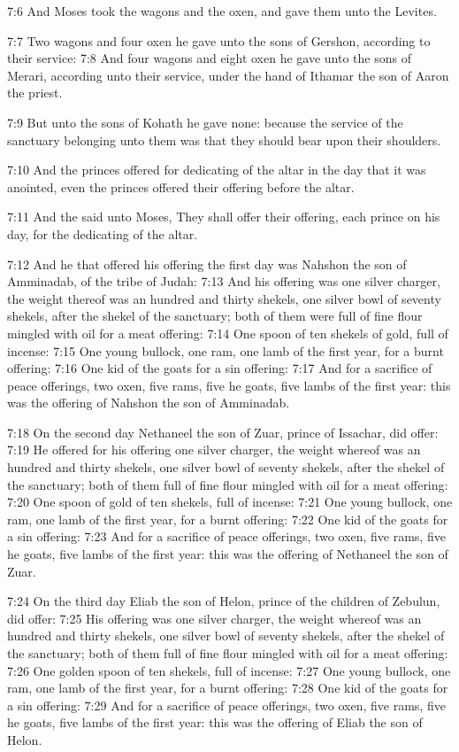 7:6 And Moses took the wagons and the oxen, and gave them unto the
Levites.

7:7 Two wagons and four oxen he gave unto the sons of Gershon,
according to their service: 7:8 And four wagons and eight oxen he gave
unto the sons of Merari, according unto their service, under the hand
of Ithamar the son of Aaron the priest.

7:9 But unto the sons of Kohath he gave none: because the service of
the sanctuary belonging unto them was that they should bear upon their
shoulders.

7:10 And the princes offered for dedicating of the altar in the day
that it was anointed, even the princes offered their offering before
the altar.

7:11 And the \LORD said unto Moses, They shall offer their offering,
each prince on his day, for the dedicating of the altar.

7:12 And he that offered his offering the first day was Nahshon the
son of Amminadab, of the tribe of Judah: 7:13 And his offering was one
silver charger, the weight thereof was an hundred and thirty shekels,
one silver bowl of seventy shekels, after the shekel of the sanctuary;
both of them were full of fine flour mingled with oil for a meat
offering: 7:14 One spoon of ten shekels of gold, full of incense: 7:15
One young bullock, one ram, one lamb of the first year, for a burnt
offering: 7:16 One kid of the goats for a sin offering: 7:17 And for a
sacrifice of peace offerings, two oxen, five rams, five he goats, five
lambs of the first year: this was the offering of Nahshon the son of
Amminadab.

7:18 On the second day Nethaneel the son of Zuar, prince of Issachar,
did offer: 7:19 He offered for his offering one silver charger, the
weight whereof was an hundred and thirty shekels, one silver bowl of
seventy shekels, after the shekel of the sanctuary; both of them full
of fine flour mingled with oil for a meat offering: 7:20 One spoon of
gold of ten shekels, full of incense: 7:21 One young bullock, one ram,
one lamb of the first year, for a burnt offering: 7:22 One kid of the
goats for a sin offering: 7:23 And for a sacrifice of peace offerings,
two oxen, five rams, five he goats, five lambs of the first year: this
was the offering of Nethaneel the son of Zuar.

7:24 On the third day Eliab the son of Helon, prince of the children
of Zebulun, did offer: 7:25 His offering was one silver charger, the
weight whereof was an hundred and thirty shekels, one silver bowl of
seventy shekels, after the shekel of the sanctuary; both of them full
of fine flour mingled with oil for a meat offering: 7:26 One golden
spoon of ten shekels, full of incense: 7:27 One young bullock, one
ram, one lamb of the first year, for a burnt offering: 7:28 One kid of
the goats for a sin offering: 7:29 And for a sacrifice of peace
offerings, two oxen, five rams, five he goats, five lambs of the first
year: this was the offering of Eliab the son of Helon.

